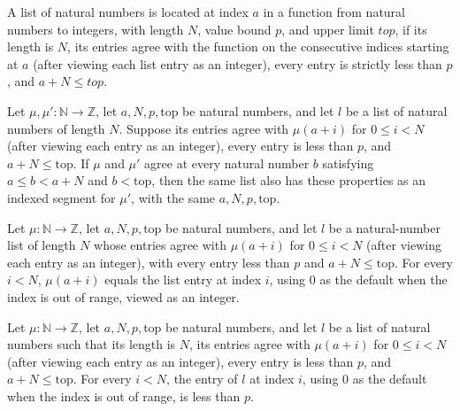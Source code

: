 \begin{definition}
\label{Light.IndexAt}
\leanok
{}
A list of natural numbers is located at index $a$ in a function from natural numbers to
integers, with length $N$, value bound $p$, and upper limit $top$, if its length is $N$,
its entries agree with the function on the consecutive indices starting at $a$ (after
viewing each list entry as an integer), every entry is strictly less than $p$, and
$a+N\le top$.
\end{definition}

\begin{theorem}
\label{Light.IndexAt.keep}
\leanok
{}
Let $\mu,\mu':\mathbb{N}\to\mathbb{Z}$, let $a,N,p,\mathrm{top}$ be natural numbers, and
let $l$ be a list of natural numbers of length $N$. Suppose its entries agree with
$\mu(a+i)$ for $0\le i<N$ (after viewing each entry as an integer), every entry is less
than $p$, and $a+N\le\mathrm{top}$. If $\mu$ and $\mu'$ agree at every natural number
$b$ satisfying $a\le b<a+N$ and $b<\mathrm{top}$, then the same list also has these
properties as an indexed segment for $\mu'$, with the same $a,N,p,\mathrm{top}$.
\end{theorem}

\begin{theorem}
\label{Light.IndexAt.read}
\leanok
{}
Let $\mu:\mathbb{N}\to\mathbb{Z}$, let $a,N,p,\mathrm{top}$ be natural numbers, and let
$l$ be a natural-number list of length $N$ whose entries agree with $\mu(a+i)$ for $0\le
i<N$ (after viewing each entry as an integer), with every entry less than $p$ and
$a+N\le\mathrm{top}$. For every $i<N$, $\mu(a+i)$ equals the list entry at index $i$,
using $0$ as the default when the index is out of range, viewed as an integer.
\end{theorem}

\begin{theorem}
\label{Light.IndexAt.getD_lt}
\leanok
{}
Let $\mu:\mathbb{N}\to\mathbb{Z}$, let $a,N,p,\mathrm{top}$ be natural numbers, and let
$l$ be a list of natural numbers such that its length is $N$, its entries agree with
$\mu(a+i)$ for $0\le i<N$ (after viewing each entry as an integer), every entry is less
than $p$, and $a+N\le \mathrm{top}$. For every $i<N$, the entry of $l$ at index $i$,
using $0$ as the default when the index is out of range, is less than $p$.
\end{theorem}
